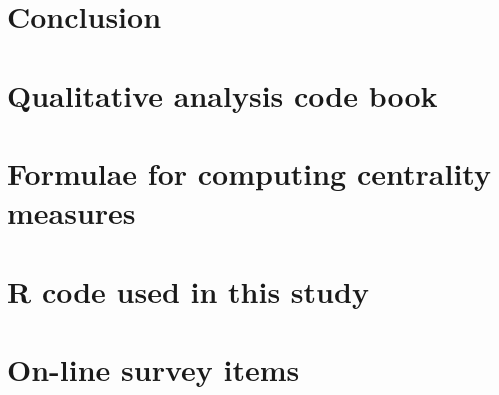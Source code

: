 \documentclass[12pt,twoside]{report}
\begin{document}
\chapter{Conclusion}


\pagebreak




\appendix
\chapter{Qualitative analysis code book}


\chapter{Formulae for computing centrality measures}


\chapter{R code used in this study}


\chapter{On-line survey items}
% 
\end{document}
